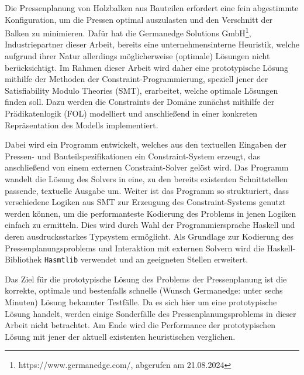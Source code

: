 \abstract
\label{Abstrakt}

Die Pressenplanung von Holzbalken aus Bauteilen erfordert eine fein abgestimmte Konfiguration, um die Pressen optimal auszulasten und den Verschnitt der Balken zu minimieren.
Dafür hat die Germanedge Solutions GmbH\footnote{https://www.germanedge.com/, abgerufen am 21.08.2024}, Industriepartner dieser Arbeit, bereits eine unternehmensinterne Heuristik, welche aufgrund ihrer Natur allerdings möglicherweise (optimale) Lösungen nicht berücksichtigt.
Im Rahmen dieser Arbeit wird daher eine prototypische Lösung mithilfe der Methoden der Constraint-Programmierung, speziell jener der Satisfiability Modulo Theories (SMT), erarbeitet, welche optimale Lösungen finden soll.
Dazu werden die Constraints der Domäne zunächst mithilfe der Prädikatenlogik (FOL) modelliert und anschließend in einer konkreten Repräsentation des Modells implementiert.

Dabei wird ein Programm entwickelt, welches aus den textuellen Eingaben der Pressen- und Bauteilspezifikationen ein Constraint-System erzeugt, das anschließend von einem externen Constraint-Solver gelöst wird.
Das Programm wandelt die Lösung des Solvers in eine, zu den bereits existenten Schnittstellen passende, textuelle Ausgabe um.
Weiter ist das Programm so strukturiert, dass verschiedene Logiken aus SMT zur Erzeugung des Constraint-Systems genutzt werden können,
um die performanteste Kodierung des Problems in jenen Logiken einfach zu ermitteln.
Dies wird durch Wahl der Programmiersprache Haskell und deren ausdrucksstarkes Typsystem ermöglicht.
Als Grundlage zur Kodierung des Pressenplanungsproblems und Interaktion mit externen Solvern
wird die Haskell-Bibliothek \texttt{Hasmtlib} \cite{hasmtlib} verwendet und an geeigneten Stellen erweitert.

Das Ziel für die prototypische Lösung des Problems der Pressenplanung ist die korrekte, optimale und bestenfalls schnelle (Wunsch Germanedge: unter sechs Minuten) Lösung bekannter Testfälle.
Da es sich hier um eine prototypische Lösung handelt, werden einige Sonderfälle des Pressenplanungsproblems in dieser Arbeit nicht betrachtet.
Am Ende wird die Performance der prototypischen Lösung mit jener der aktuell existenten heuristischen verglichen.
